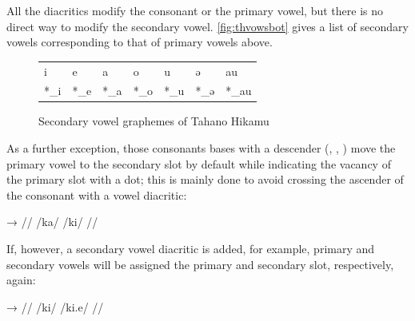 \noindent All the diacritics modify the consonant or the primary vowel, 
but there is no direct way to modify the secondary vowel. 
\autoref{fig:thvowsbot} gives a list of secondary vowels corresponding to that 
of primary vowels above.

\begin{figure}[ht]
\caption{Secondary vowel graphemes of Tahano Hikamu}

\begin{tabu} to \linewidth{X[c] X[c] X[c] X[c] X[c] X[c] X[c]}
\toprule
\tableheaderfont	i & e & a & o & u & ə & au \\
\rowfont{\Tagati\huge}	*\_i & *\_e & *\_a & *\_o & *\_u & *\_ə & *\_au \\

\bottomrule
\end{tabu}
\label{fig:thvowsbot}
\end{figure}

As a further exception, those consonants bases with a descender (, 
, ) move the primary vowel to the secondary slot by default while 
indicating the vacancy of the primary slot with a dot; this is mainly done to 
avoid crossing the ascender of the consonant with a vowel diacritic:

\pex[lingstyle=thex]\begingl
	\gla {}	→	 //
	\glb /ka/	{}	/ki/ //
\endgl\xe

\noindent If, however, a secondary vowel diacritic is added, for example, 
primary and secondary vowels will be assigned the primary and secondary slot, 
respectively, again:

\pex[lingstyle=thex]\begingl
	\gla {}	→	 //
	\glb /ki/	{}	/ki.e/ //
\endgl\xe


